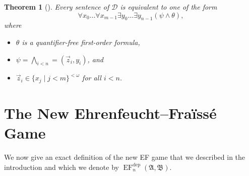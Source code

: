 \documentclass[10pt,a4paper]{amsart}
\newtheorem{theorem}[definition]{Theorem}
\DeclareMathOperator{\EF}{EF}
\newcommand{\EFdep}{\EF^{\mathrm{dep}}}
\newcommand{\A}{\mathfrak{A}}
\newcommand{\B}{\mathfrak{B}}
\newcommand{\dep}{\mathop{=}}
\newcommand{\deplog}{\mathcal D}
\begin{document}
\begin{theorem}[\cite{MR2351449}]\label{theorem: normal form}
    Every sentence of $\deplog$ is equivalent to one of the form
    \[
        \forall x_0\dots\forall x_{m-1}\exists y_0\dots\exists y_{n-1}(\psi\land\theta),
    \]
    where
    \begin{itemize}
        \item $\theta$ is a  quantifier-free first-order formula,
        \item $\psi = \bigwedge_{i<n}\dep(\vec z_i, y_i)$, and
        \item $\vec z_i \in\{x_j \mid j<m\}^{<\omega}$ for all $i<n$.
    \end{itemize}
\end{theorem}

\section{The New Ehrenfeucht--Fraïssé Game}\label{The new game}

We now give an exact definition of the new EF game that we described in the introduction and which we denote by $\EFdep_n(\A,\B)$.
\end{document}
